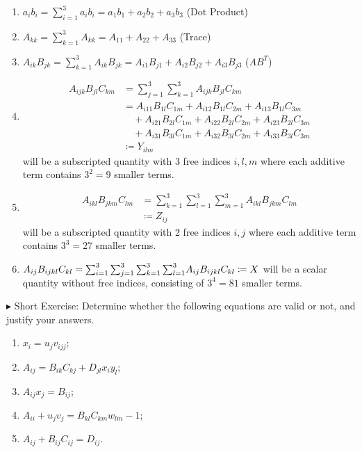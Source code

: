 \begin{enumerate}
    \item $a_ib_i = \sum_{i=1}^3 a_ib_i = a_1b_1 + a_2b_2 + a_3b_3$ (Dot Product)
    \item $A_{kk} = \sum_{k=1}^3 A_{kk} = A_{11} + A_{22} + A_{33}$ (Trace)
    \item $A_{ik}B_{jk} = \sum_{k=1}^3 A_{ik}B_{jk} = A_{i1}B_{j1} + A_{i2}B_{j2} + A_{i3}B_{j3}$ ($AB^T$)
    \item \begin{align*}
    A_{ijk}B_{jl}C_{km} &= \sum_{j=1}^3 \sum_{k=1}^3 A_{ijk}B_{jl}C_{km} \\
    &= A_{i11}B_{1l}C_{1m} + A_{i12}B_{1l}C_{2m} + A_{i13}B_{1l}C_{3m} \\
    &\quad + A_{i21}B_{2l}C_{1m} + A_{i22}B_{2l}C_{2m} + A_{i23}B_{2l}C_{3m} \\
    &\quad + A_{i31}B_{3l}C_{1m} + A_{i32}B_{3l}C_{2m} + A_{i33}B_{3l}C_{3m} \\
    &\coloneq Y_{ilm}
    \end{align*}
    will be a subscripted quantity with 3 free indices $i, l, m$ where each additive term contains $3^2 = 9$ smaller terms.
    \item \begin{align*}
    A_{ikl}B_{jkm}C_{lm} &= \sum_{k=1}^3 \sum_{l=1}^3 \sum_{m=1}^3 A_{ikl}B_{jkm}C_{lm} \\
    &\coloneq Z_{ij}
    \end{align*}
    will be a subscripted quantity with 2 free indices $i, j$ where each additive term contains $3^3 = 27$ smaller terms.
    \item $A_{ij}B_{ijkl}C_{kl} = \smash{\sum_{i=1}^3 \sum_{j=1}^3 \sum_{k=1}^3 \sum_{l=1}^3} A_{ij}B_{ijkl}C_{kl} \coloneq X$ will be a scalar quantity without free indices, consisting of $3^4 = 81$ smaller terms.
\end{enumerate}
$\blacktriangleright$ Short Exercise: Determine whether the following equations are valid or not, and justify your answers.\footnotemark
\begin{enumerate}
    \item $x_i = u_jv_{ijj}$;
    \item $A_{ij} = B_{ik}C_{kj} + D_{jl}x_iy_l$;
    \item $A_{ij}x_j = B_{ij}$;
    \item $A_{ii} + u_jv_j = B_{kl}C_{km}w_{lm} - 1$;
    \item $A_{ij} + B_{ij}C_{ij} = D_{ij}$.
\end{enumerate}

